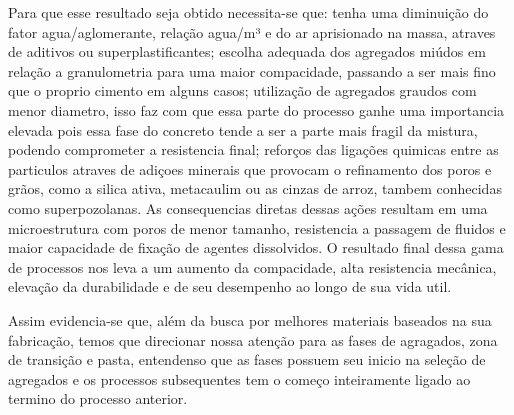 Para que esse resultado seja obtido necessita-se que: tenha uma diminuição do fator agua/aglomerante, relação agua/m³ e do ar aprisionado na massa, atraves de aditivos ou superplastificantes; escolha adequada dos agregados miúdos em relação a granulometria para uma maior compacidade, passando a ser mais fino que o proprio cimento em alguns casos; utilização de agregados graudos com menor diametro, isso faz com que essa parte do processo ganhe uma importancia elevada pois essa fase do concreto tende a ser a parte mais fragil da mistura, podendo comprometer a resistencia final; reforços das ligações quimicas entre as particulos atraves de adiçoes minerais que provocam o refinamento dos poros e grãos, como a silica ativa, metacaulim ou as cinzas de arroz, tambem conhecidas como superpozolanas. As consequencias diretas dessas ações resultam em uma microestrutura com poros de menor tamanho, resistencia a passagem de fluidos e maior capacidade de fixação de agentes dissolvidos. O resultado final dessa gama de processos nos leva a um aumento da compacidade, alta resistencia mecânica, elevação da durabilidade e de seu desempenho ao longo de sua vida util.

Assim evidencia-se que, além da busca por melhores materiais baseados na sua fabricação, temos que direcionar nossa atenção para as fases de agragados, zona de transição e pasta, entendenso que as fases possuem seu inicio na seleção de agregados e os processos subsequentes tem o começo inteiramente ligado ao termino do processo anterior. 


